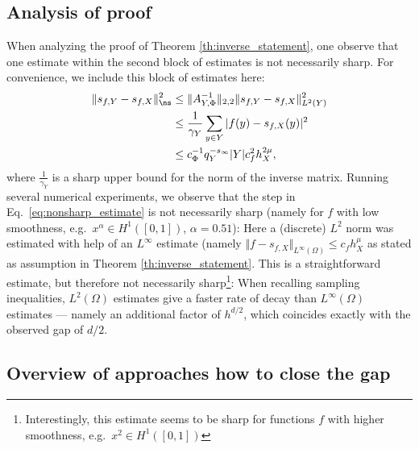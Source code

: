 \documentclass[a4paper, 10pt]{article}
\begin{document}
\subsection{Analysis of proof}

When analyzing the proof of Theorem \ref{th:inverse_statement}, one observe that one estimate within the second block of estimates is not necessarily sharp.
For convenience, we include this block of estimates here:
\begin{align}
\label{eq:nonsharp_estimate}
\Vert s_{f, Y} - s_{f, X} \Vert_{\ns}^2 &\leq \Vert A_{Y, \Phi}^{-1} \Vert_{2,2} \Vert s_{f, Y} - s_{f, X} \Vert_{L^2(Y)}^2 \notag \\
&\leq \frac{1}{\gamma_Y} \sum_{y \in Y} |f(y) - s_{f, X}(y)|^2 \notag \\
&\leq c_\Phi^{-1} q_Y^{-s_\infty} |Y| c_f^2 h_X^{2\mu},
\end{align}
where $\frac{1}{\gamma_Y}$ is a sharp upper bound for the norm of the inverse matrix.
Running several numerical experiments, we observe that the step in Eq.\ \eqref{eq:nonsharp_estimate} is not necessarily sharp (namely for $f$ with low smoothness, e.g.\ $x^\alpha \in H^1([0, 1])$, $\alpha = 0.51$):
Here a (discrete) $L^2$ norm was estimated with help of an $L^\infty$ estimate (namely $\Vert f - s_{f, X}\Vert_{L^\infty(\Omega)} \leq c_f h_X^\mu$ as stated as assumption in Theorem \ref{th:inverse_statement}.
This is a straightforward estimate, but therefore not necessarily sharp\footnote{Interestingly, this estimate seems to be sharp for functions $f$ with higher smoothness, e.g.\ $x^{2} \in H^1([0, 1])$}: 
When recalling sampling inequalities, $L^2(\Omega)$ estimates give a faster rate of decay than $L^\infty(\Omega)$ estimates --- namely an additional factor of $h^{d/2}$, which coincides exactly with the observed gap of $d/2$.

\subsection{Overview of approaches how to close the gap}
\end{document}
